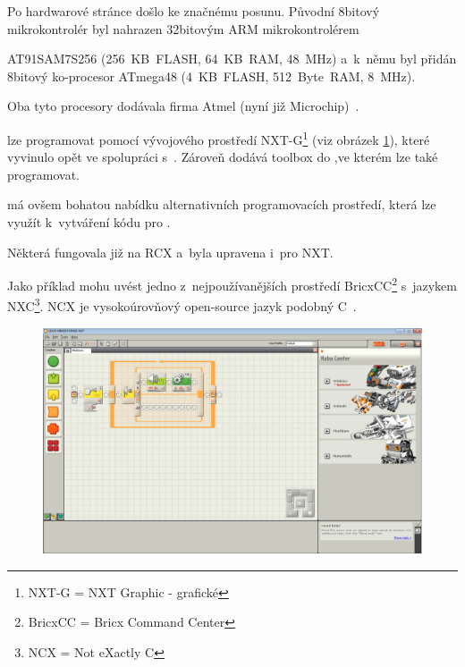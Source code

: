 Po hardwarové stránce došlo ke značnému posunu. Původní 8bitový mikrokontrolér byl nahrazen 32bitovým ARM mikrokontrolérem %

AT91SAM7S256 (256~KB~FLASH, 64~KB~RAM, 48~MHz) a~k~němu byl přidán 8bitový ko-procesor ATmega48 (4~KB~FLASH, 512~Byte~RAM, 8~MHz). 

Oba tyto procesory dodávala firma Atmel (nyní již Microchip)~\cite{legoMindstormsNXT_hardware}.


\brick{ }lze programovat pomocí vývojového prostředí NXT-G\footnote{NXT-G = NXT Graphic - grafické} (viz obrázek \ref{fig:lego-mindstorms-nxt-g}), které \lego{ }vyvinulo opět ve spolupráci s~\NI{~}\cite{legoMindstormsNXT_NXT-G}. 
Zároveň \NI{ }dodává toolbox do \labview{ },ve kterém lze \brick{ }také programovat. 

\legoNXT{ }má ovšem bohatou nabídku alternativních programovacích prostředí, která lze využít k~vytváření kódu pro \brick. 

Některá fungovala již na RCX a~byla upravena i~pro NXT. 

Jako příklad mohu uvést jedno z~nejpoužívanějších prostředí BricxCC\footnote{BricxCC = Bricx Command Center} s~jazykem NXC\footnote{NCX = Not eXactly C}. 
NCX je vysokoúrovňový open-source jazyk podobný C~\cite{legoWikipediaNXT_NXC}.

\begin{figure}[h]
	\centering
	\includegraphics[width=\textwidth]{images/lego-mindstorms-nxt-g.png}
	\caption[]{\protect\footnotemark}
	\label{fig:lego-mindstorms-nxt-g}
\end{figure}

